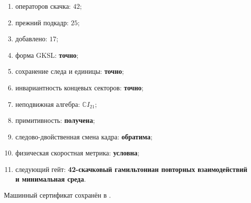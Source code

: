 \begin{protocol}
\begin{enumerate}
 \item операторов скачка: \textbf{$42$};
 \item прежний подкадр: \textbf{$25$};
 \item добавлено: \textbf{$17$};
 \item форма GKSL: \textbf{точно};
 \item сохранение следа и единицы: \textbf{точно};
 \item инвариантность концевых секторов: \textbf{точно};
 \item неподвижная алгебра: \textbf{$\mathbb CI_{21}$};
 \item примитивность: \textbf{получена};
 \item следово-двойственная смена кадра: \textbf{обратима};
 \item физическая скоростная метрика: \textbf{условна};
 \item следующий гейт: \textbf{42-скачковый гамильтониан повторных взаимодействий и
       минимальная среда}.
\end{enumerate}
\end{protocol}

Машинный сертификат сохранён в
.